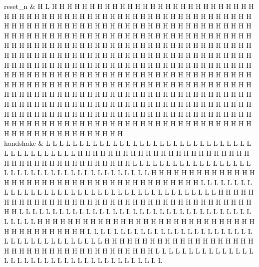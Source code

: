 \begin{tikztimingtable} [xscale=2.0]
	reset\_n & H L H H H H H H H H H H H H H H H H H H H H H H H H H H H H H H H H H H H H H H H H H H H H H H H H H H H H H H H H H H H H H H H H H H H H H H H H H H H H H H H H H H H H H H H H H H H H H H H H H H H H H H H H H H H H H H H H H H H H H H H H H H H H H H H H H H H H H H H H H H H H H H H H H H H H H H H H H H H H H H H H H H H H H H H H H H H H H H H H H H H H H H H H H H H H H H H H H H H H H H H H H H H H H H H H H H H H H H H H H H H H H H H H H H H H H H H H H H H H H H H H H H H H H H H H H H H H H H H H H H H H H H H H H H H H H H H H H H H H H H H H H H H H H H H H H H H H H H H H H H H H H H H H H H H H H H H H H H H H H H H H H H H H H H H H H H H H H H H H H H H H H H H H H H H H H H H H H H H H H H H H H H H H H H H H H H H H H H H H H H H H H H H H H H H H H H H H H H H H H H H H H H H H H H H H H H H H H H H H H H H H H H H H H H H H H H H H H H H H H H H \\
	handshake & L L L L L L L L L L L L L L L L L L L L L L L L L L L L L L L L L L L L L L L L L L H H H H H H H H H H H H H H H H H H H H H H H H H H H H H H H H H H H H H H H H L L L L L L L L L L L L L L L L L L L L L L L L L L L L L L L L L L L L L L L L H H H H H H H H H H H H H H H H H H H H H H H H H H H H H H H H H H H H H H H H L L L L L L L L L L L L L L L L L L L L L L L L L L L L L L L L L L L L L L L L H H H H H H H H H H H H H H H H H H H H H H H H H H H H H H H H H H H H H H H H L L L L L L L L L L L L L L L L L L L L L L L L L L L L L L L L L L L L L L L L H H H H H H H H H H H H H H H H H H H H H H H H H H H H H H H H H H H H H H H H L L L L L L L L L L L L L L L L L L L L L L L L L L L L L L L L L L L L L L L L H H H H H H H H H H H H H H H H H H H H H H H H H H H H H H H H H H H H H H H H L L L L L L L L L L L L L L L L L L L L L L L L L L L L L L L L L L L L L L L \\

\end{tikztimingtable}

